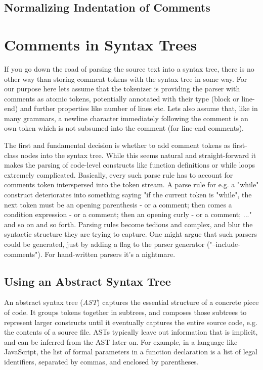 \documentclass[11pt,a4paper]{article}
\begin{document}
\subsection{Normalizing Indentation of Comments}


\section{Comments in Syntax Trees}

If you go down the road of parsing the source text into a syntax tree, there is
no other way than storing comment tokens with the syntax tree in some way. For
our purpose here lets assume that the tokenizer is providing the parser with
comments as atomic tokens, potentially annotated with their type (block or
line-end) and further properties like number of lines etc. Lets also assume
that, like in many grammars, a newline character immediately following the
comment is an own token which is not subsumed into the comment (for line-end
comments).

The first and fundamental decision is whether to add comment tokens as
first-class nodes into the syntax tree. While this seems natural and
straight-forward it makes the parsing of code-level constructs like function
definitions or while loops extremely complicated. Basically, every such parse
rule has to account for comments token interspersed into the token stream. A
parse rule for e.g. a "while" construct deteriorates into something saying "if
the current token is "while", the next token must be an opening parenthesis - or
a comment; then comes a condition expression - or a comment; then an opening
curly - or a comment; ..." and so on and so forth. Parsing rules become tedious
and complex, and blur the syntactic structure they are trying to capture. One
might argue that such parsers could be generated, just by adding a flag to the
parser generator ("--include-comments"). For hand-written parsers it's a
nightmare.

\subsection{Using an Abstract Syntax Tree}

An abstract syntax tree (\emph{AST}) captures the essential structure of a
concrete piece of code. It groups tokens together in subtrees, and composes
those subtrees to represent larger constructs until it eventually captures the
entire source code, e.g. the contents of a source file. ASTs typically leave out
information that is implicit, and can be inferred from the AST later on. For
example, in a language like JavaScript, the list of formal parameters in a
function declaration is a list of legal identifiers, separated by commas, and
enclosed by parentheses.
\end{document}
